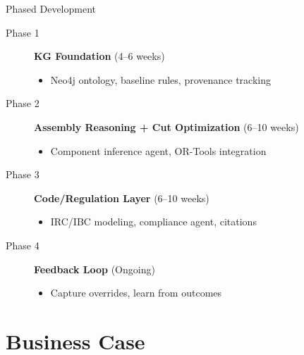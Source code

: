 \documentclass[11pt,aspectratio=169]{beamer}
\begin{document}
\begin{frame}{Phased Development}
\begin{description}
    \item[Phase 1] \textbf{KG Foundation} (4--6 weeks)
    \begin{itemize}
        \item Neo4j ontology, baseline rules, provenance tracking
    \end{itemize}

    \item[Phase 2] \textbf{Assembly Reasoning + Cut Optimization} (6--10 weeks)
    \begin{itemize}
        \item Component inference agent, OR-Tools integration
    \end{itemize}

    \item[Phase 3] \textbf{Code/Regulation Layer} (6--10 weeks)
    \begin{itemize}
        \item IRC/IBC modeling, compliance agent, citations
    \end{itemize}

    \item[Phase 4] \textbf{Feedback Loop} (Ongoing)
    \begin{itemize}
        \item Capture overrides, learn from outcomes
    \end{itemize}
\end{description}
\end{frame}

\section{Business Case}
\end{document}
